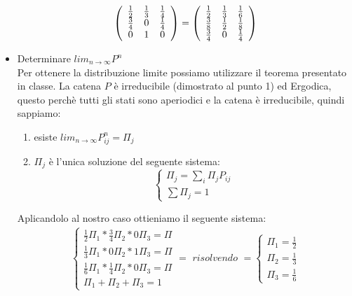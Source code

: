 \documentclass[a4paper]{article}
\begin{document}
\begin{itemize}
$$		\left(\begin{array}{c c c}{{\frac{1}{2}}}&{{\frac{1}{3}}}&{{\frac{1}{4}}}\\ {{\frac{3}{4}}}&{{0}}&{{\frac{1}{4}}}\\ {{0}}&{{1}}&{{0}}\end{array}\right)
		= \left(\begin{array}{c c c}{{\frac{1}{2}}}&{{\frac{1}{3}}}&{{\frac{1}{6}}}\\ {{\frac{3}{8}}}&{{\frac{1}{2}}}&{{\frac{1}{8}}}\\ {{\frac{3}{4}}}&{{0}}&{{\frac{1}{4}}}\end{array}\right) $$
	\item Determinare $lim_{n \rightarrow \infty}P^n$\\
		Per ottenere la distribuzione limite possiamo utilizzare il teorema presentato in classe. La catena $P$ è irreducibile (dimostrato al punto 1) ed Ergodica, questo perchè tutti gli stati sono aperiodici e la catena è irreducibile, quindi sappiamo:
		\begin{enumerate}
			\item esiste $lim_{n\rightarrow\infty}P^n_{ij}=\Pi_j$
			\item $\Pi_j$ è l'unica soluzione del seguente sistema: 
				\begin{equation*}
					\begin{cases} \Pi_j = \sum_i \Pi_j P_{ij}\\
						\sum \Pi_j = 1
					\end{cases}
				\end{equation*}
		\end{enumerate}
		Aplicandolo al nostro caso ottieniamo il seguente sistema:
		\begin{align*}
			\begin{cases}
				\frac{1}{2}\Pi_1 * \frac{3}{4}\Pi_2 * 0\Pi_3 = \Pi\\
				\frac{1}{3}\Pi_1 * 0\Pi_2 * 1\Pi_3 = \Pi\\
				\frac{1}{6}\Pi_1 * \frac{1}{4}\Pi_2 * 0\Pi_3 = \Pi\\
				\Pi_1 + \Pi_2 + \Pi_3 = 1
			\end{cases}
			= \textit{ risolvendo } = 
			\begin{cases}
				\Pi_1 = \frac{1}{2}\\
				\Pi_2 = \frac{1}{3}\\
				\Pi_3 = \frac{1}{6}
			\end{cases}
		\end{align*}
\end{itemize}
\end{document}
